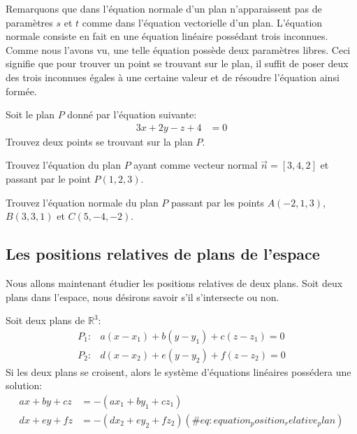 \documentclass[]{book}
\theoremstyle{definition}
\theoremstyle{definition}
\theoremstyle{definition}
\theoremstyle{remark}
\let\BeginKnitrBlock\begin \let\EndKnitrBlock\end
\begin{document}
Remarquons que dans l'équation normale d'un plan n'apparaissent pas de paramètres \(s\) et \(t\) comme dans l'équation vectorielle d'un plan. L'équation normale consiste en fait en une équation linéaire possédant trois inconnues. Comme nous l'avons vu, une telle équation possède deux paramètres libres. Ceci signifie que pour trouver un point se trouvant sur le plan, il suffit de poser deux des trois inconnues égales à une certaine valeur et de résoudre l'équation ainsi formée.

\BeginKnitrBlock{example}
\protect\hypertarget{exm:unnamed-chunk-222}{}{\label{exm:unnamed-chunk-222} }Soit le plan \(P\) donné par l'équation suivante:
\begin{align*}
3x+2y-z+4 &= 0
\end{align*}
Trouvez deux points se trouvant sur la plan \(P\).
\EndKnitrBlock{example}

\BeginKnitrBlock{example}
\protect\hypertarget{exm:unnamed-chunk-223}{}{\label{exm:unnamed-chunk-223} }Trouvez l'équation du plan \(P\) ayant comme vecteur normal \(\vec n=[3,4,2]\) et passant par le point \(P(1,2,3)\).
\EndKnitrBlock{example}

\BeginKnitrBlock{example}
\protect\hypertarget{exm:unnamed-chunk-224}{}{\label{exm:unnamed-chunk-224} }Trouvez l'équation normale du plan \(P\) passant par les points \(A(-2,1,3)\), \(B(3,3,1)\) et \(C(5,-4,-2)\).
\EndKnitrBlock{example}

\hypertarget{les-positions-relatives-de-plans-de-lespace}{%
\subsection{Les positions relatives de plans de l'espace}\label{les-positions-relatives-de-plans-de-lespace}}

Nous allons maintenant étudier les positions relatives de deux plans. Soit deux plans dans l'espace, nous désirons savoir s'il s'intersecte ou non.

Soit deux plans de \(\mathbb{R}^3\):
\begin{align*}
P_1 :& a(x-x_1)+b(y-y_1)+c(z-z_1)=0 \\
P_2 :& d(x-x_2)+e(y-y_2)+f(z-z_2)=0
\end{align*}
Si les deux plans se croisent, alors le système d'équations linéaires possédera une solution:
\begin{align}
ax+by+cz &= -(ax_1+by_1+cz_1) \\
dx+ey+fz &= -(dx_2+ey_2+fz_2)
(\#eq:equation_position_relative_plan)
\end{align}
\end{document}
